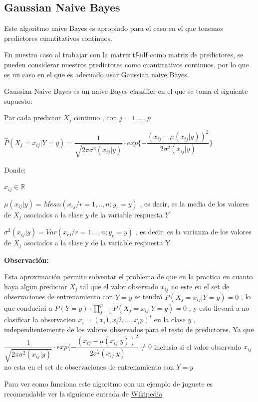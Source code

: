 \documentclass[
  11pt,
  a4paper,
]{article}
\begin{document}
\hypertarget{gaussian-naive-bayes}{%
\subsection{Gaussian Naive Bayes}\label{gaussian-naive-bayes}}

Este algoritmo naive Bayes es apropiado para el caso en el que tenemos
predictores cuantitativos continuos.

En nuestro caso al trabajar con la matriz tf-idf como matriz de
predictores, se pueden considerar nuestros predictores como
cuantitativos continuos, por lo que es un caso en el que es adecuado
usar Gaussian naive Bayes.

Gaussian Naive Bayes es un naive Bayes classifier en el que se toma el
siguiente supuesto:

Par cada predictor \(X_j\) continuo , con \(j=1,...,p\)

\(\widehat{P}(X_j=x_{ij} | Y=y) = \dfrac{1}{\sqrt{2\pi \sigma^2(x_{ij}| y)}} \cdot exp \lbrace - \dfrac{(x_{ij} - \mu(x_{ij}|y))^2}{2 \sigma^2(x_{ij}| y)} \rbrace\)

Donde:

\(x_{ij} \in \mathbb{R}\)

\(\mu(x_{ij}| y) = Mean( x_{rj} / r=1,..,n ; y_r = y )\) , es decir, es
la media de los valores de \(X_j\) asociados a la clase \(y\) de la
variable respuesta \(Y\)

\(\sigma^2(x_{ij}| y) = Var( x_{rj} / r=1,..,n ; y_r = y )\) , es decir,
es la varianza de los valores de \(X_j\) asociados a la clase y de la
variable respuesta Y

\textbf{Observación:}

Esta aproximación permite solventar el problema de que en la practica en
cuanto haya algun predictor \(X_j\) tal que el valor observado
\(x_{ij}\) no este en el set de observaciones de entrenamiento con
\(Y=y\) se tendrá \(\widehat{P}(X_j=x_{ij} | Y=y) = 0\) , lo que
conducirá a \(P(Y=y) \cdot\prod_{j=1}^{p} P(X_j=x_{ij} | Y=y) = 0\) , y
esto llevará a no clasificar la observacion
\(x_i = (x_i1 , x_i2, ..., x_ip)^t\) en la clase \(y\) ,
independientemente de los valores observados para el resto de
predictores. Ya que
\(\dfrac{1}{\sqrt{2\pi \sigma^2(x_{ij}| y)}} \cdot exp \lbrace - \dfrac{(x_{ij} - \mu(x_{ij}|y))^2}{2 \sigma^2(x_{ij}| y)} \neq 0\)
inclusio si el valor observado \(x_{ij}\) no esta en el set de
observaciones de entrenamiento con \(Y=y\)

Para ver como funciona este algoritmo con un ejemplo de juguete es
recomendable ver la siguiente entrada de
\href{https://es.wikipedia.org/wiki/Clasificador_bayesiano_ingenuo\#Entrenamiento}{Wikipedia}
\end{document}

